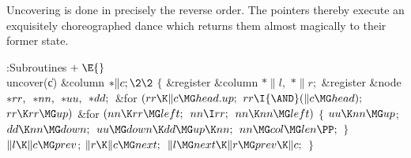 Uncovering is done in precisely the reverse order. The pointers thereby
execute an exquisitely choreo\-graphed dance which returns them almost
magically to their former state.

\Y\B\4:Subroutines\X${}\mathrel+\E{}$\6
\\{uncover}(\|c)\1\1\6
\&{column} ${}{*}\|c;\2\2{}$\6
${}\{{}$\5
\1\&{register} \&{column} ${}{*}\|l,{}$ ${}{*}\|r;{}$\6
\&{register} \&{node} ${}{*}\\{rr},{}$ ${}{*}\\{nn},{}$ ${}{*}\\{uu},{}$ ${}{*}%
\\{dd};{}$\7
\&{for} ${}(\\{rr}\K\|c\MG\\{head}.\\{up};{}$ ${}\\{rr}\I{\AND}(\|c\MG%
\\{head});{}$ ${}\\{rr}\K\\{rr}\MG\\{up}){}$\1\6
\&{for} ${}(\\{nn}\K\\{rr}\MG\\{left};{}$ ${}\\{nn}\I\\{rr};{}$ ${}\\{nn}\K%
\\{nn}\MG\\{left}){}$\5
${}\{{}$\1\6
${}\\{uu}\K\\{nn}\MG\\{up}{}$;\5
${}\\{dd}\K\\{nn}\MG\\{down};{}$\6
${}\\{uu}\MG\\{down}\K\\{dd}\MG\\{up}\K\\{nn};{}$\6
${}\\{nn}\MG\\{col}\MG\\{len}\PP;{}$\6
\4${}\}{}$\2\2\6
${}\|l\K\|c\MG\\{prev}{}$;\5
${}\|r\K\|c\MG\\{next};{}$\6
${}\|l\MG\\{next}\K\|r\MG\\{prev}\K\|c;{}$\6
\4${}\}{}$\2\par
\fi

